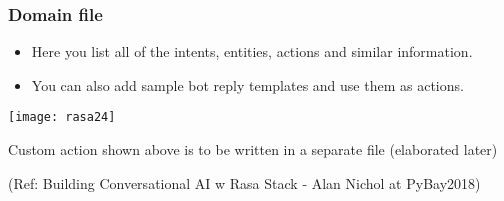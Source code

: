  \begin{frame}[fragile]\frametitle{Domain file}
 
\begin{itemize}
\item Here you list all of the intents, entities, actions and similar information. 
\item You can also add sample bot reply templates and use them as actions.
\end{itemize}

\begin{center}
\texttt{[image: rasa24]}
\end{center}

Custom action shown above is to be written in a separate file (elaborated later)


{\tiny (Ref: Building Conversational AI w Rasa Stack - Alan Nichol at PyBay2018)}

\end{frame}








